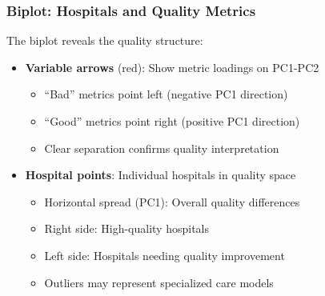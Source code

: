 \documentclass[aspectratio=169]{beamer}
\begin{document}
\begin{frame}
    \frametitle{Biplot: Hospitals and Quality Metrics}
    The biplot reveals the quality structure:
    \begin{itemize}
        \item \textbf{Variable arrows} (red): Show metric loadings on PC1-PC2 \pause
              \begin{itemize}
                  \item ``Bad'' metrics point left (negative PC1 direction) \pause
                  \item ``Good'' metrics point right (positive PC1 direction) \pause
                  \item Clear separation confirms quality interpretation \pause
              \end{itemize}
        \item \textbf{Hospital points}: Individual hospitals in quality space \pause
              \begin{itemize}
                  \item Horizontal spread (PC1): Overall quality differences \pause
                  \item Right side: High-quality hospitals \pause
                  \item Left side: Hospitals needing quality improvement \pause
                  \item Outliers may represent specialized care models \pause
              \end{itemize}
    \end{itemize}
\end{frame}
\end{document}
